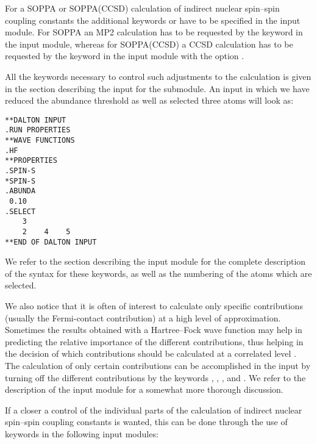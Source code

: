 For a SOPPA or SOPPA(CCSD) calculation of
indirect nuclear spin--spin coupling constants the additional keywords
 or  have to be specified in the 
input module. For SOPPA an MP2 calculation has to be requested by the keyword
 in the  input module, whereas for SOPPA(CCSD) a
CCSD calculation has to be requested by the keyword  in the  input module with the  option .

All the keywords necessary to control such adjustments to the
calculation is given in the section describing the input for the
 submodule. An input
in which we  have reduced the abundance threshold as well as
selected three atoms will look as:

\begin{verbatim}
**DALTON INPUT
.RUN PROPERTIES
**WAVE FUNCTIONS
.HF
**PROPERTIES
.SPIN-S
*SPIN-S
.ABUNDA
 0.10
.SELECT
    3
    2    4    5
**END OF DALTON INPUT
\end{verbatim}

We refer to the section describing the  input module for
the complete description of the syntax for these keywords, as well as
the numbering of the atoms which are selected.

We also notice that it is often of interest to calculate only specific
contributions (usually the Fermi-contact contribution) at a high level
of approximation. Sometimes the results obtained with a Hartree--Fock
wave function may help in predicting the relative importance of the different
contributions, thus helping in the decision of which contributions
should be calculated at a correlated level \cite{krthklbpjcpl226}.
The calculation of only certain contributions can be accomplished in
the input by turning off the different
contributions by the keywords , ,
, and . We refer to the description of the
 input module for a somewhat more thorough discussion.

If a closer a control of the individual parts of the calculation of
indirect nuclear spin--spin coupling constants is wanted, this can be
done through the use of keywords in the following input modules:

